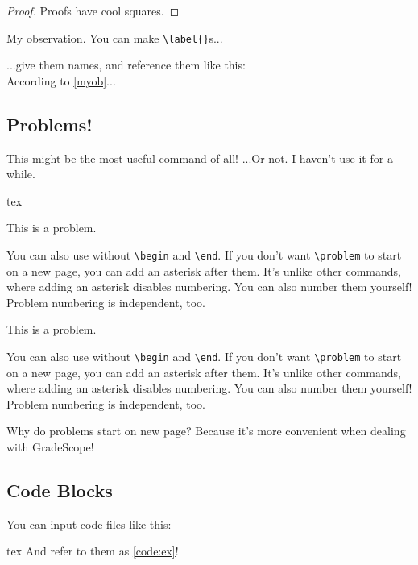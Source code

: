 \documentclass{fhw}
\begin{document}
\begin{proof}
  Proofs have cool squares.
\end{proof}

\begin{observation}
  My observation. You can make \verb|\label{}|s...
	\label{myob}
\end{observation}

\begin{lemma}[My lemma]
	...give them names, and reference them like this:\\
	According to \cref{myob}...
\end{lemma}

\subsection{Problems!}

This might be the most useful command of all!
...Or not. I haven't use it for a while.
\begin{Code}{tex}
\begin{problem}
  This is a problem.
\end{problem}
\problem You can also use without \verb|\begin| and \verb|\end|.
\problem* If you don't want \verb|\problem| to start on a new page, you can add an asterisk after them. It's unlike other commands, where adding an asterisk disables numbering.
\problem*[C8763 --- Starburst] You can also number them yourself!
\problem* Problem numbering is independent, too.
\end{Code}

\begin{problem}
  This is a problem.
\end{problem}
\problem You can also use without \verb|\begin| and \verb|\end|.
\problem* If you don't want \verb|\problem| to start on a new page, you can add an asterisk after them. It's unlike other commands, where adding an asterisk disables numbering.
\problem*[C8763 --- Starburst] You can also number them yourself!
\problem* Problem numbering is independent, too.

Why do problems start on new page? Because it's more convenient when dealing with GradeScope!

\subsection{Code Blocks}

You can input code files like this:

\begin{Code}{tex}
And refer to them as \cref{code:ex}!
\end{Code}
\end{document}
